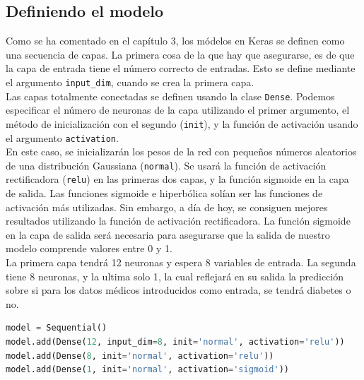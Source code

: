 \subsection{Definiendo el modelo}
Como se ha comentado en el capítulo 3, los módelos en Keras se definen como una secuencia de capas. La primera cosa de la que hay que asegurarse, es de que la capa de entrada tiene el número correcto de entradas. Esto se define mediante el argumento \lstinline{input_dim}, cuando se crea la primera capa.\\
Las capas totalmente conectadas se definen usando la clase \lstinline{Dense}. Podemos especificar el número de neuronas de la capa utilizando el primer argumento, el método de inicialización con el segundo (\lstinline{init}), y la función de activación usando el argumento \lstinline{activation}.\\
En este caso, se inicializarán los pesos de la red con pequeños números aleatorios de una distribución Gaussiana (\lstinline{normal}). Se usará la función de activación rectificadora (\lstinline{relu}) en las primeras dos capas, y la función sigmoide en la capa de salida. Las funciones sigmoide e hiperbólica solían ser las funciones de activación más utilizadas. Sin embargo, a día de hoy, se consiguen mejores resultados utilizando la función de activación rectificadora. La función sigmoide en la capa de salida será necesaria para asegurarse que la salida de nuestro modelo comprende valores entre 0 y 1.\\
La primera capa tendrá 12 neuronas y espera 8 variables de entrada. La segunda tiene 8 neuronas, y la ultima solo 1, la cual reflejará en su salida la predicción sobre si para los datos médicos introducidos como entrada, se tendrá diabetes o no.
\begin{lstlisting}[language=Python]
model = Sequential()
model.add(Dense(12, input_dim=8, init='normal', activation='relu'))
model.add(Dense(8, init='normal', activation='relu'))
model.add(Dense(1, init='normal', activation='sigmoid'))
\end{lstlisting}

